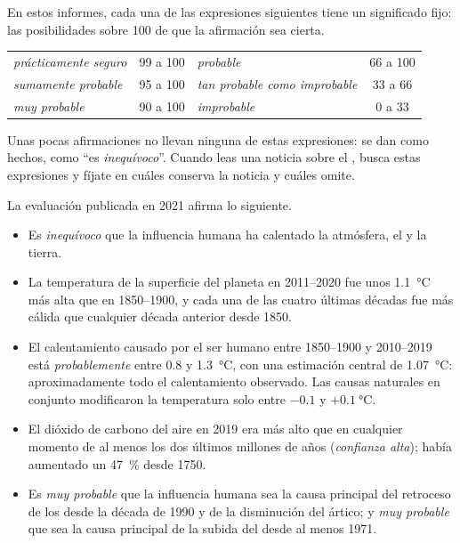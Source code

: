 En estos informes, cada una de las expresiones siguientes tiene un
significado fijo: las posibilidades sobre 100 de que la afirmación sea
cierta.

\begin{center}
{\small
\begin{tabular}{|l|c||l|c|}
\hline
\emph{prácticamente seguro} & 99 a 100 & \emph{probable} & 66 a 100 \\
\emph{sumamente probable} & 95 a 100 & \emph{tan probable como improbable} & 33 a 66 \\
\emph{muy probable} & 90 a 100 & \emph{improbable} & 0 a 33 \\
\hline
\end{tabular}}
\end{center}

\noindent Unas pocas afirmaciones no llevan ninguna de estas expresiones:
se dan como hechos, como ``es \emph{inequívoco}''. Cuando leas una noticia
sobre el , busca estas expresiones y fíjate en cuáles conserva la
noticia y cuáles omite.

La evaluación publicada en 2021 afirma lo siguiente.
\begin{itemize}
  \item Es \emph{inequívoco} que la influencia humana ha calentado la
        atmósfera, el  y la tierra.
  \item La temperatura de la superficie del planeta en 2011--2020 fue
        unos \qty{1.1}{\degreeCelsius} más alta que en 1850--1900, y cada
        una de las cuatro últimas décadas fue más cálida que cualquier
        década anterior desde 1850.
  \item El calentamiento causado por el ser humano entre 1850--1900 y
        2010--2019 está \emph{probablemente} entre 0.8 y
        \qty{1.3}{\degreeCelsius}, con una estimación central de
        \qty{1.07}{\degreeCelsius}: aproximadamente todo el calentamiento
        observado. Las causas naturales en conjunto modificaron la
        temperatura solo entre $-0.1$ y $+\qty{0.1}{\degreeCelsius}$.
  \item El dióxido de carbono del aire en 2019 era más alto que en
        cualquier momento de al menos los dos últimos millones de años
        (\emph{confianza alta}); había aumentado un 47~\% desde 1750.
  \item Es \emph{muy probable} que la influencia humana sea la causa
        principal del retroceso de los  desde la década de 1990 y
        de la disminución del  ártico; y \emph{muy probable}
        que sea la causa principal de la subida del  desde al menos
        1971.
\end{itemize}

